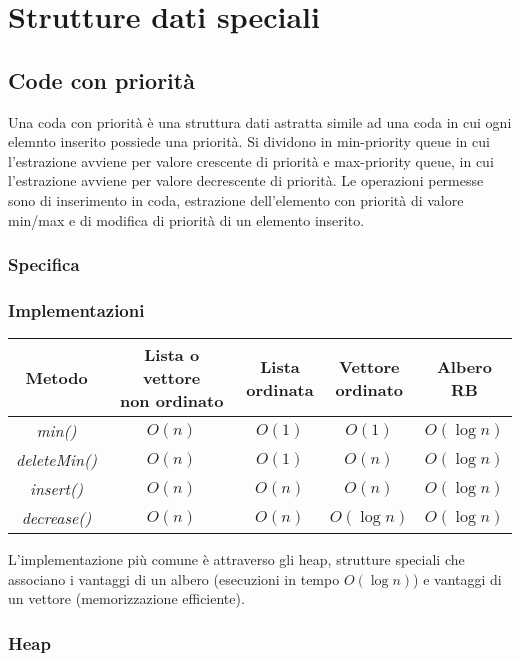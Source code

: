 \chapter{Strutture dati speciali}
\section{Code con priorit\`a}
Una coda con priorit\`a \`e una struttura dati astratta simile ad una coda in cui ogni elemnto inserito possiede una priorit\`a. Si dividono in min-priority 
queue in cui l'estrazione avviene per valore crescente di priorit\`a e max-priority queue, in cui l'estrazione avviene per valore decrescente di priorit\`a.
Le operazioni permesse sono di inserimento in coda, estrazione dell'elemento con priorit\`a di valore min/max e di modifica di priorit\`a di un elemento 
inserito.
\subsection{Specifica}

\subsection{Implementazioni}
\begin{center}
\begin{tabular}{|c|c|c|c|c|}
\hline
Metodo & \makecell{Lista o vettore \\non ordinato} & \makecell{Lista\\ordinata} & \makecell{Vettore\\ordinato} & \makecell{Albero\\RB}\\
\hline
\emph{min()} & $O(n)$ & $O(1)$ & $O(1)$ & $O(\log n)$\\
\hline
\emph{deleteMin()} & $O(n)$ & $O(1)$ & $O(n)$ & $O(\log n)$\\
\hline
\emph{insert()} & $O(n)$ & $O(n)$ & $O(n)$ & $O(\log n)$\\
\hline
\emph{decrease()} & $O(n)$ & $O(n)$ & $O(\log n)$ & $O(\log n)$\\
\hline
\end{tabular}
\end{center}
L'implementazione pi\`u comune \`e attraverso gli heap, strutture speciali che associano i vantaggi di un albero (esecuzioni in tempo $O(\log n)$) e 
vantaggi di un vettore (memorizzazione efficiente).
\subsection{Heap}
